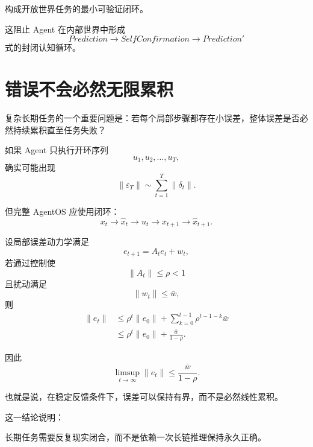 构成开放世界任务的最小可验证闭环。

这阻止 Agent 在内部世界中形成
\begin{equation}
Prediction
\rightarrow
SelfConfirmation
\rightarrow
Prediction'
\end{equation}
式的封闭认知循环。

\section{错误不会必然无限累积}

复杂长期任务的一个重要问题是：若每个局部步骤都存在小误差，整体误差是否必然持续累积直至任务失败？

如果 Agent 只执行开环序列
\begin{equation}
u_1,u_2,\ldots,u_T,
\end{equation}
确实可能出现
\begin{equation}
\|\varepsilon_T\|
\sim
\sum_{t=1}^{T}
\|\delta_t\|.
\end{equation}

但完整 AgentOS 应使用闭环：
\begin{equation}
x_t
\rightarrow
\hat x_t
\rightarrow
u_t
\rightarrow
x_{t+1}
\rightarrow
\hat x_{t+1}.
\end{equation}

设局部误差动力学满足
\begin{equation}
e_{t+1}
=
A_te_t+w_t,
\end{equation}
若通过控制使
\begin{equation}
\|A_t\|
\leq
\rho<1
\end{equation}
且扰动满足
\begin{equation}
\|w_t\|
\leq
\bar w,
\end{equation}
则
\begin{align}
\|e_t\|
&\leq
\rho^t\|e_0\|
+
\sum_{k=0}^{t-1}
\rho^{t-1-k}\bar w\\
&\leq
\rho^t\|e_0\|
+
\frac{\bar w}{1-\rho}.
\end{align}

因此
\begin{equation}
\limsup_{t\rightarrow\infty}
\|e_t\|
\leq
\frac{\bar w}{1-\rho}.
\end{equation}

也就是说，在稳定反馈条件下，误差可以保持有界，而不是必然线性累积。

这一结论说明：

\begin{statementbox}
长期任务需要反复现实闭合，而不是依赖一次长链推理保持永久正确。
\end{statementbox}

